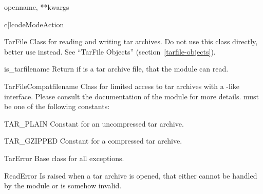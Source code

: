 \begin{funcdesc}{open}{name, **kwargs}
    \begin{tableii}{c|l}{code}{Mode}{Action}
    \end{tableii}
\end{funcdesc}

\begin{classdesc*}{TarFile}
    Class for reading and writing tar archives. Do not use this
    class directly, better use  instead.
    See ``TarFile Objects'' (section~\ref{tarfile-objects}).
\end{classdesc*}

\begin{funcdesc}{is_tarfile}{name}
    Return  if  is a tar archive file, that
    the  module can read.
\end{funcdesc}

\begin{classdesc}{TarFileCompat}{filename}
    Class for limited access to tar archives with a
    -like interface. Please consult the
    documentation of the  module for more details.
     must be one of the following constants:
    \begin{datadesc}{TAR_PLAIN}
        Constant for an uncompressed tar archive.
    \end{datadesc}
    \begin{datadesc}{TAR_GZIPPED}
        Constant for a  compressed tar archive.
    \end{datadesc}
\end{classdesc}

\begin{excdesc}{TarError}
    Base class for all  exceptions.
\end{excdesc}

\begin{excdesc}{ReadError}
    Is raised when a tar archive is opened, that either cannot be handled by
    the  module or is somehow invalid.
\end{excdesc}

